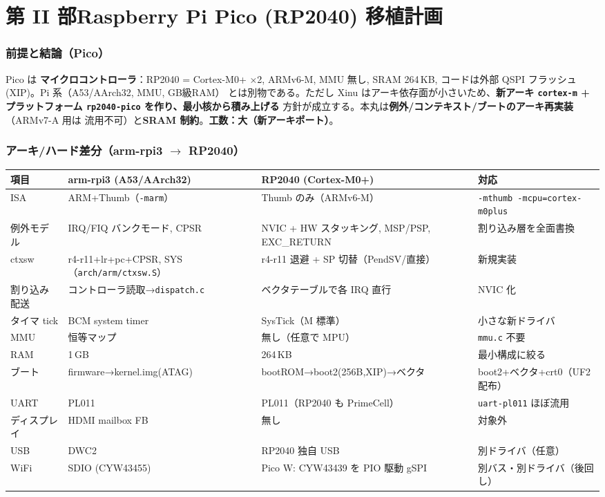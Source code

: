 \documentclass[a4paper,11pt]{ltjsarticle}
\begin{document}
\part*{第 II 部\quad Raspberry Pi Pico (RP2040) 移植計画}

\section{前提と結論（Pico）}
Pico は \textbf{マイクロコントローラ}：RP2040 = Cortex-M0+ ×2, ARMv6-M, MMU 無し,
SRAM 264\,KB, コードは外部 QSPI フラッシュ(XIP)。Pi 系（A53/AArch32, MMU, GB級RAM）
とは別物である。ただし Xinu はアーキ依存面が小さいため、\textbf{新アーキ
\texttt{cortex-m} + プラットフォーム \texttt{rp2040-pico} を作り、最小核から積み上げる}
方針が成立する。本丸は\textbf{例外/コンテキスト/ブートのアーキ再実装}（ARMv7-A 用は
流用不可）と\textbf{SRAM 制約}。\textbf{工数：大（新アーキポート）}。

\section{アーキ/ハード差分（arm-rpi3 $\rightarrow$ RP2040）}
\begin{center}\small
\begin{longtable}{@{}lp{3.7cm}p{4.0cm}p{3.6cm}@{}}
\toprule
項目 & arm-rpi3 (A53/AArch32) & RP2040 (Cortex-M0+) & 対応\\
\midrule \endhead
ISA & ARM+Thumb（\texttt{-marm}） & Thumb のみ（ARMv6-M） & \texttt{-mthumb -mcpu=cortex-m0plus}\\
例外モデル & IRQ/FIQ バンクモード, CPSR & NVIC + HW スタッキング, MSP/PSP, EXC\_RETURN & 割り込み層を全面書換\\
ctxsw & r4-r11+lr+pc+CPSR, SYS（\texttt{arch/arm/ctxsw.S}） & r4-r11 退避 + SP 切替（PendSV/直接） & 新規実装\\
割り込み配送 & コントローラ読取→\texttt{dispatch.c} & ベクタテーブルで各 IRQ 直行 & NVIC 化\\
タイマ tick & BCM system timer & SysTick（M 標準） & 小さな新ドライバ\\
MMU & 恒等マップ & 無し（任意で MPU） & \texttt{mmu.c} 不要\\
RAM & 1\,GB & 264\,KB & 最小構成に絞る\\
ブート & firmware→kernel.img(ATAG) & bootROM→boot2(256B,XIP)→ベクタ & boot2+ベクタ+crt0（UF2 配布）\\
UART & PL011 & PL011（RP2040 も PrimeCell） & \texttt{uart-pl011} ほぼ流用\\
ディスプレイ & HDMI mailbox FB & 無し & 対象外\\
USB & DWC2 & RP2040 独自 USB & 別ドライバ（任意）\\
WiFi & SDIO (CYW43455) & Pico W: CYW43439 を PIO 駆動 gSPI & 別バス・別ドライバ（後回し）\\
\bottomrule
\end{longtable}
\end{center}
\end{document}
